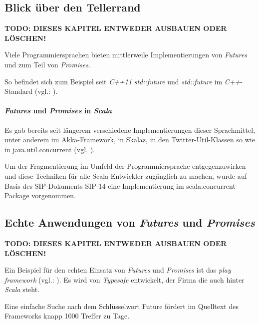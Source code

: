 \subsection{Blick über den Tellerrand}

\textbf{TODO: DIESES KAPITEL ENTWEDER AUSBAUEN ODER LÖSCHEN!}

Viele Programmiersprachen bieten mittlerweile Implementierungen von
\emph{Futures} und zum Teil von \emph{Promises}.

So befindet sich zum Beispiel seit \emph{C++11} \emph{std::future} und
\emph{std::future} im \emph{C++}-Standard (vgl.: \cite{cpp11FAQ}).

\paragraph{\emph{Futures} und \emph{Promises} in \emph{Scala}}

Es gab bereits seit längerem verschiedene Implementierungen dieser Sprachmittel,
unter anderem im Akka-Framework, in Skalaz, in den Twitter-Util-Klassen so wie
in java.util.concurrent (vgl. \cite{futuresTry}).

Um der Fragmentierung im Umfeld der Programmiersprache entgegenzuwirken und
diese Techniken für alle Scala-Entwickler zugänglich zu machen, wurde auf Basis
des SIP-Dokuments SIP-14 eine Implementierung im scala.concurrent-Package
vorgenommen.

\subsection{Echte Anwendungen von \emph{Futures} und \emph{Promises}}

\textbf{TODO: DIESES KAPITEL ENTWEDER AUSBAUEN ODER LÖSCHEN!}

Ein Beispiel für den echten Einsatz von \emph{Futures} und \emph{Promises}
ist das \emph{play framework} (vgl.: \cite{playframework}). Es wird
von \emph{Typesafe} entwickelt, der Firma die auch hinter \emph{Scala}
steht.

Eine einfache Suche nach dem Schlüsselwort \glqq Future\grqq{} fördert
im Quelltext des Frameworks knapp 1000 Treffer zu Tage.
